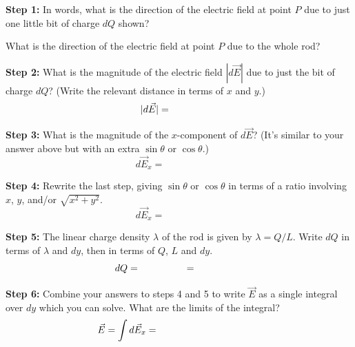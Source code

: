 
\par
\vspace{0.5cm}
\par
\textbf{Step 1:} \newline
In words, what is the direction of the electric field at point $P$ due to just one little bit of charge $dQ$ shown?

\vspace{.6in}

What is the direction of the electric field at point $P$ due to the whole rod?

\vspace{.6in}

\textbf{Step 2:} \newline
What is the magnitude of the electric field $|d\vec{E}|$  due to just the bit of charge $dQ$?  (Write the relevant distance in terms of $x$ and $y$.)
\[
|d\vec{E}|=\hspace{0.7in}
\]
\vspace{.3in}

\textbf{Step 3:} \newline
What is the magnitude of the $x$-component of   $d\vec{E}$?  (It's similar to your answer above but with an extra $\sin \theta$ or $\cos \theta$.) 
\[
d\vec{E}_x=\hspace{1in}
\]
\vspace{.3in}

\pagebreak
\textbf{Step 4:} \newline
Rewrite the last step, giving  $\sin \theta$ or $\cos \theta$ in terms of a ratio involving $x$, $y$, and/or $\sqrt{x^2 + y^2}$.
\[
d\vec{E}_x=\hspace{1in}
\]
\vspace{.3in}

\textbf{Step 5:} \newline
The linear charge density $\lambda$ of the rod is given by $\lambda = Q/L$.  Write $dQ$ in terms of $\lambda$  and $dy$, then in terms of $Q$, $L$ and $dy$.
\[
dQ=\hspace{0.7in}=\hspace{0.7in}
\]
\vspace{.3in}

\textbf{Step 6:} \newline
Combine your answers to steps 4 and 5 to write $\vec{E}$ as a single integral over $dy$ which you can solve.  What are the limits of the integral?
\[
\vec{E}=\int d\vec{E}_x=\hspace{1.5in}
\]
\vspace{.3in}

